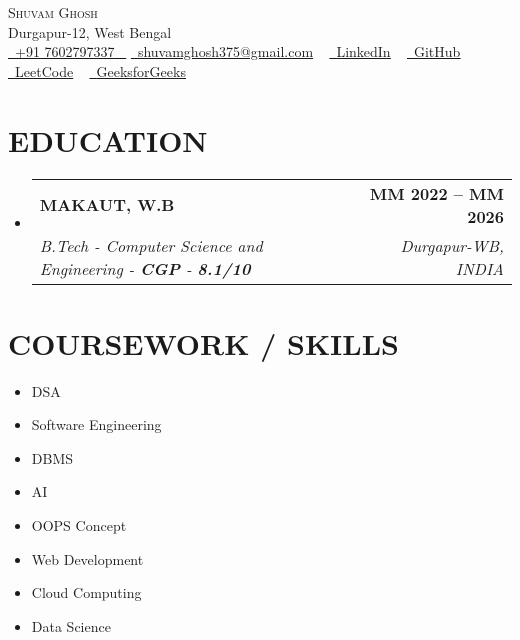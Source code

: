 \documentclass[letterpaper,11pt]{article}
\makeatletter
\newcommand{\resumeSubheading}[4]{
  \vspace{-2pt}\item
    \begin{tabular*}{1.0\textwidth}[t]{l@{\extracolsep{\fill}}r}
      \textbf{\large#1} & \textbf{\small #2} \\
      \textit{\large#3} & \textit{\small #4} \\
     
    \end{tabular*}\vspace{-7pt}
}
\newcommand{\resumeSubHeadingListStart}{\begin{itemize}[leftmargin=0.0in, label={}]}
\newcommand{\resumeSubHeadingListEnd}{\end{itemize}}
\makeatother
\begin{document}

\begin{center}
    {\Huge \scshape Shuvam Ghosh} \\ \vspace{1pt}
    Durgapur-12, West Bengal \\ \vspace{1pt}
    \small \href{tel:+xxxxxxxxxxxx}{ \raisebox{-0.1\height}\faPhone\ \underline{+91 7602797337} ~} \href{mailto:yourname@gmail.com}{\raisebox{-0.2\height}\faEnvelope\  \underline{shuvamghosh375@gmail.com}} ~
    \href{linkedin.com/in/shuvam-ghosh-7a469a264}{\raisebox{-0.2\height}\faLinkedinSquare\ \underline{LinkedIn}}  ~
    \href{https://github.com/mastershuvam}{\raisebox{-0.2\height}\faGithub\ \underline{GitHub}} ~
    \href{https://leetcode.com/u/Shuvam234/}{\ \underline{LeetCode}} ~
    \vspace{-8pt}
    \href{https://www.geeksforgeeks.org/user/shuvamghb21h/}{\ \underline{GeeksforGeeks}} ~
\end{center}
 \vspace{0.5mm}

\section{EDUCATION}
  \resumeSubHeadingListStart
    \resumeSubheading
      {MAKAUT, W.B}{MM 2022 -- MM 2026}
      {B.Tech - Computer Science and Engineering - \textbf{CGP} - \textbf{8.1/10}}{Durgapur-WB, INDIA}
  \resumeSubHeadingListEnd

\section{COURSEWORK / SKILLS}
    \begin{multicols}{4}
        \begin{itemize}[itemsep=-2pt, parsep=5pt]
            \item DSA
            \item Software Engineering
            \item DBMS
            \item AI
            \item OOPS Concept
            \item Web Development
            \item Cloud Computing
            \item Data Science   
        \end{itemize}
    \end{multicols}
    \vspace*{2.0\multicolsep}
\end{document}
